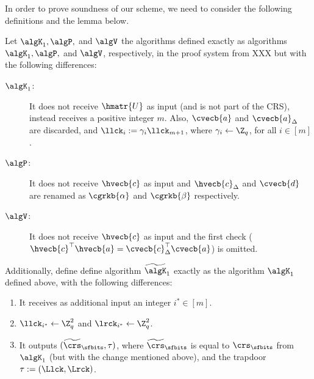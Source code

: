 In order to prove soundness of our scheme, we need to consider the following definitions and the lemma below.

\begin{definition}
Let $\algK_1,\algP,$ and $\algV$ the algorithms defined exactly as algorithms $\algK_1,\algP,$ and $\algV$, respectively, in the proof system from XXX but with the following differences:
\begin{description}
\item[$\algK_1$:] It does not receive $\hmatr{U}$ as input (and is not part of the CRS), instead receives a positive integer $m$. Also, $\cvecb{a}$ and $\cvecb{a}_\Delta$ are discarded, and $\llck_i := \gamma_i\llck_{m+1}$, where $\gamma_i\gets\Z_q$, for all $i\in[m]$.
\item[$\algP$:] It does not receive $\hvecb{c}$ as input and $\hvecb{c}_\Delta$ and $\cvecb{d}$ are renamed as $\cgrkb{\alpha}$ and $\cgrkb{\beta}$ respectively.
\item[$\algV$:] It does not receive $\hvecb{c}$ as input and the first check ($\hvecb{c}^\top\hvecb{a}=\cvecb{c}_\Delta^\top\cvecb{a}$) is omitted.
\end{description}

Additionally, define define algorithm $\widetilde{\algK}_1$ exactly as the algorithm $\algK_1$ defined above, with the following differences:
\begin{enumerate}[label=(\alph*)]
\item It receives as additional input an integer $i^*\in[m]$.
\item $\llck_{i^*}\gets\Z_q^2$ and $\lrck_{i^*}\gets\Z_q^2$.
\item It outputs $(\widetilde{\crs}_\sfbits,\tau)$, where $\widetilde{\crs}_\sfbits$ is equal to $\crs_\sfbits$ from $\algK_1$ (but with the change mentioned above), and the trapdoor $\tau:=(\Llck,\Lrck)$.
\end{enumerate}
\end{definition}

